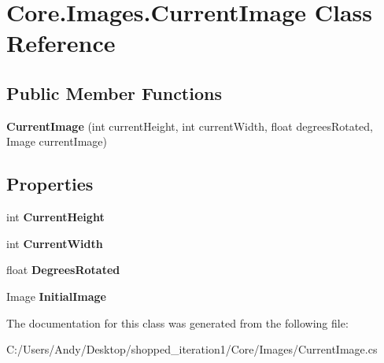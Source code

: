 \hypertarget{class_core_1_1_images_1_1_current_image}{
\section{Core.Images.CurrentImage Class Reference}
\label{class_core_1_1_images_1_1_current_image}
}
\subsection*{Public Member Functions}
\begin{DoxyCompactItemize}
\item 
\hypertarget{class_core_1_1_images_1_1_current_image_ad7e692ba1acbf65ec8d92daeb692d76f}{
{\bfseries CurrentImage} (int currentHeight, int currentWidth, float degreesRotated, Image currentImage)}
\label{class_core_1_1_images_1_1_current_image_ad7e692ba1acbf65ec8d92daeb692d76f}

\end{DoxyCompactItemize}
\subsection*{Properties}
\begin{DoxyCompactItemize}
\item 
\hypertarget{class_core_1_1_images_1_1_current_image_ab2452b0e9c5be5b48f8252bdda88c517}{
int {\bfseries CurrentHeight}}
\label{class_core_1_1_images_1_1_current_image_ab2452b0e9c5be5b48f8252bdda88c517}

\item 
\hypertarget{class_core_1_1_images_1_1_current_image_aed5c70c5941eab8b59fff6674b549080}{
int {\bfseries CurrentWidth}}
\label{class_core_1_1_images_1_1_current_image_aed5c70c5941eab8b59fff6674b549080}

\item 
\hypertarget{class_core_1_1_images_1_1_current_image_ac04056faec84c7b007e246aab71c1f77}{
float {\bfseries DegreesRotated}}
\label{class_core_1_1_images_1_1_current_image_ac04056faec84c7b007e246aab71c1f77}

\item 
\hypertarget{class_core_1_1_images_1_1_current_image_aefe3840e115e66c880e7a560340cc267}{
Image {\bfseries InitialImage}}
\label{class_core_1_1_images_1_1_current_image_aefe3840e115e66c880e7a560340cc267}

\end{DoxyCompactItemize}


The documentation for this class was generated from the following file:\begin{DoxyCompactItemize}
\item 
C:/Users/Andy/Desktop/shopped\_\-iteration1/Core/Images/CurrentImage.cs\end{DoxyCompactItemize}
